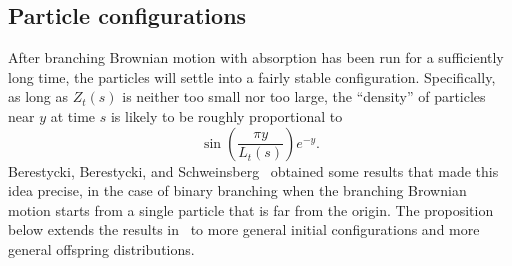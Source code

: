 \documentclass[AHL,Unicode,longabstracts,published]{cedram}
\newcommand{\1} {\mathds{1}}
\begin{document}
\subsection{Particle configurations}\label{sec:particle_configurations}

After branching Brownian motion with absorption has been run for a sufficiently long time, the particles will settle into a fairly stable configuration. Specifically, as long as $Z_t(s)$ is neither too small nor too large, the ``density'' of particles near $y$ at time $s$ is likely to be roughly proportional to
\begin{equation}\label{roughdensity}
\sin \left(\frac{\pi y}{L_t(s)} \right) e^{-y}.
\end{equation}
Berestycki, Berestycki, and Schweinsberg~\cite{bbs3} obtained some results that made this idea precise, in the case of binary branching when the branching Brownian motion starts from a single particle that is far from the origin. The proposition below extends the results in~\cite{bbs3} to more general initial configurations and more general offspring distributions.
\end{document}
